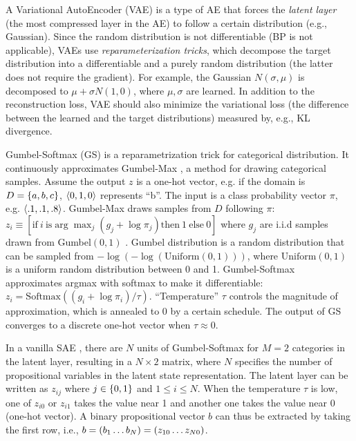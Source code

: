 A Variational AutoEncoder (VAE) \cite{kingma2013auto} is a type of AE that forces the \emph{latent layer} (the most compressed layer in the AE) to follow a certain distribution (e.g., Gaussian).
Since the random distribution is not differentiable (BP is not applicable), VAEs use \emph{reparameterization tricks}, which decompose the target distribution into a differentiable and a purely random distribution (the latter does not require the gradient).
For example, the Gaussian $N(\sigma,\mu)$ is decomposed to $\mu+\sigma N(1,0)$, where $\mu,\sigma$ are learned.
In addition to the reconstruction loss, VAE should also minimize the variational loss (the difference between the learned and the target distributions) measured by, e.g.,  KL divergence.

Gumbel-Softmax (GS) is a re\-para\-metri\-zation trick \cite{jang2016categorical} for categorical distribution.
It continuously approximates Gumbel-Max \cite{maddison2014sampling}, a method for drawing categorical samples.
Assume the output $z$ is a one-hot vector, e.g. if the domain is $D={\left\{a,b,c\right\}}$, ${\left<0,1,0\right>}$ represents ``b''.
The input is a class probability vector $\pi$, e.g. ${\left<.1,.1,.8\right>}$.
Gumbel-Max draws samples from $D$ following $\pi$:
 $z_i \equiv [ \text{if}\ i\ \text{is} \arg \max_j (g_j+\log \pi_j) \text{then}\ 1\ \text{else}\ 0 ]$
where $g_j$ are i.i.d samples drawn from Gumbel$(0,1)$ \cite{gumbel1954statistical}.
Gumbel distribution is a random distribution that can be sampled from $-\log (-\log (\text{Uniform}(0,1)))$, where
$\text{Uniform}(0,1)$ is a uniform random distribution between 0 and 1.
Gumbel-Softmax approximates argmax with softmax to make it differentiable:
$z_i = \text{Softmax}((g_i+\log \pi_i)/\tau)$.
``Temperature'' $\tau$ controls the magnitude of approximation, which is annealed to 0 by a certain schedule.
The output of GS converges to a discrete one-hot vector when $\tau\approx 0$.

In a vanilla SAE \cite{Asai2018}, there are $N$ units of Gumbel-Softmax
for $M=2$ categories in the latent layer, resulting in a $N\times 2$ matrix,
where $N$ specifies the number of propositional variables in the latent
state representation. The latent layer can be written as
$z_{ij}$ where $j\in {\left\{0,1\right\}}$ and $1\leq i \leq N$.  When the
temperature $\tau$ is low, one of $z_{i0}$ or $z_{i1}$ takes the value
near 1 and another one takes the value near 0 (one-hot vector).  A binary
propositional vector $b$ can thus be extracted by taking the first row, i.e.,
$b={\left(b_1\ldots b_N\right)}={\left(z_{10}\ldots z_{N0}\right)}$.

